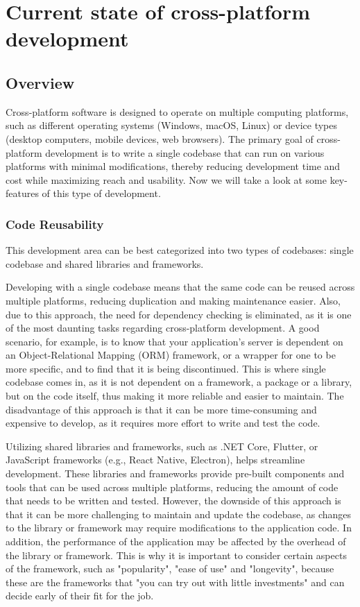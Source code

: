 \chapter{Current state of cross-platform development}

\section{Overview}

Cross-platform software is designed to operate on multiple computing platforms, 
such as different operating systems (Windows, macOS, Linux) or device types (desktop computers, mobile devices, web browsers).
The primary goal of cross-platform development is to write a single codebase that can run on various platforms with minimal modifications, 
thereby reducing development time and cost while maximizing reach and usability.
Now we will take a look at some key-features of this type of development.

\subsection{Code Reusability}
This development area can be best categorized into two types of codebases: single codebase and shared libraries and frameworks.

\par
Developing with a single codebase means that the same code can be reused across multiple platforms, reducing duplication and making maintenance easier.
Also, due to this approach, the need for dependency checking is eliminated, as it is one of the most daunting tasks regarding cross-platform development.
A good scenario, for example, is to know that your application's server is dependent on an Object-Relational Mapping (ORM) framework, or a wrapper for one to be more specific, and to find that it is being discontinued.
This is where single codebase comes in, as it is not dependent on a framework, a package or a library, 
but on the code itself, thus making it more reliable and easier to maintain. 
The disadvantage of this approach is that it can be more time-consuming and expensive to develop, as it requires more effort to write and test the code.

\par
Utilizing shared libraries and frameworks, such as .NET Core, Flutter, or JavaScript frameworks (e.g., React Native, Electron), helps streamline development.
These libraries and frameworks provide pre-built components and tools that can be used across multiple platforms, 
reducing the amount of code that needs to be written and tested.
However, the downside of this approach is that it can be more challenging to maintain and update the codebase, 
as changes to the library or framework may require modifications to the application code.
In addition, the performance of the application may be affected by the overhead of the library or framework.
This is why it is important to consider certain aspects of the framework, such as "popularity", "ease of use" and "longevity",
because these are the frameworks that "you can try out with little investments" \cite{frameworks} and can decide early of their fit for the job.

